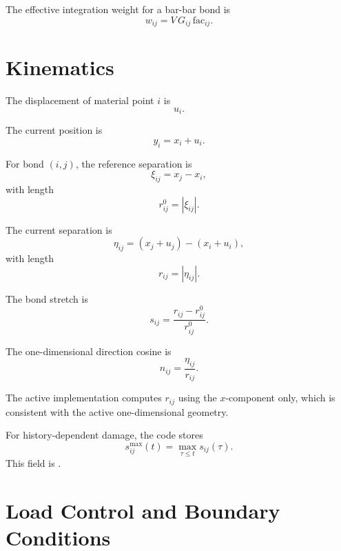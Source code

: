 \documentclass[11pt]{article}
\newcommand{\code}[1]{\texttt{\detokenize{#1}}}
\begin{document}
The effective integration weight for a bar-bar bond is
\begin{equation}
    w_{ij} = V\,G_{ij}\,\mathrm{fac}_{ij}.
\end{equation}

\section{Kinematics}

The displacement of material point \(i\) is
\begin{equation}
    u_i .
\end{equation}

The current position is
\begin{equation}
    y_i = x_i+u_i .
\end{equation}

For bond \((i,j)\), the reference separation is
\begin{equation}
    \xi_{ij} = x_j-x_i,
\end{equation}
with length
\begin{equation}
    r_{ij}^0 = |\xi_{ij}|.
\end{equation}

The current separation is
\begin{equation}
    \eta_{ij}
    =
    (x_j+u_j)-(x_i+u_i),
\end{equation}
with length
\begin{equation}
    r_{ij}=|\eta_{ij}|.
\end{equation}

The bond stretch is
\begin{equation}
    s_{ij}
    =
    \frac{r_{ij}-r_{ij}^0}{r_{ij}^0}.
\end{equation}

The one-dimensional direction cosine is
\begin{equation}
    n_{ij} =
    \frac{\eta_{ij}}{r_{ij}}.
\end{equation}

The active implementation computes \(r_{ij}\) using the \(x\)-component only,
which is consistent with the active one-dimensional geometry.

For history-dependent damage, the code stores
\begin{equation}
    s_{ij}^{\max}(t)
    =
    \max_{\tau\le t} s_{ij}(\tau).
\end{equation}
This field is \code{bond_s_history[i][j]}.

\section{Load Control and Boundary Conditions}
\end{document}
